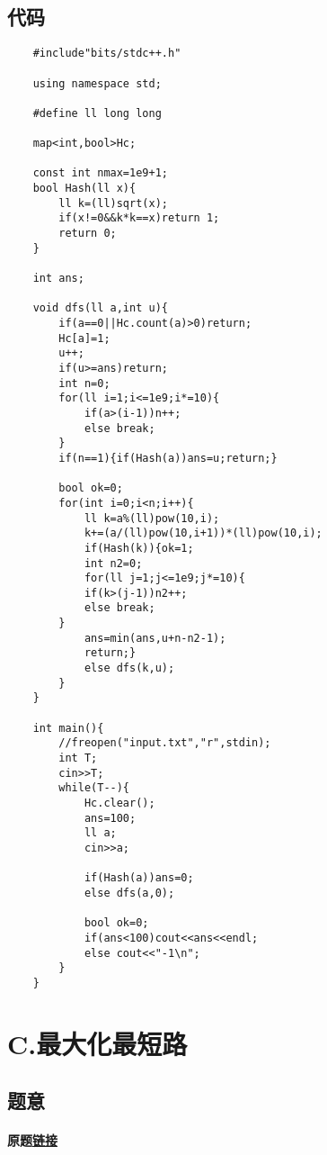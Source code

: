 \documentclass[cyan,pad,cn]{elegantnote}
\begin{document}
\subsection{代码}
\begin{lstlisting}
    #include"bits/stdc++.h"

    using namespace std;
    
    #define ll long long
    
    map<int,bool>Hc;
    
    const int nmax=1e9+1;
    bool Hash(ll x){
        ll k=(ll)sqrt(x);
        if(x!=0&&k*k==x)return 1;
        return 0;
    }
    
    int ans;
    
    void dfs(ll a,int u){
        if(a==0||Hc.count(a)>0)return;
        Hc[a]=1;
        u++;
        if(u>=ans)return;
        int n=0;
        for(ll i=1;i<=1e9;i*=10){
            if(a>(i-1))n++;
            else break;
        }
        if(n==1){if(Hash(a))ans=u;return;}
        
        bool ok=0;
        for(int i=0;i<n;i++){
            ll k=a%(ll)pow(10,i);
            k+=(a/(ll)pow(10,i+1))*(ll)pow(10,i);
            if(Hash(k)){ok=1;
            int n2=0;
            for(ll j=1;j<=1e9;j*=10){
            if(k>(j-1))n2++;
            else break;
        }
            ans=min(ans,u+n-n2-1);
            return;}
            else dfs(k,u);
        }
    }
    
    int main(){
        //freopen("input.txt","r",stdin);
        int T;
        cin>>T;
        while(T--){
            Hc.clear();
            ans=100;
            ll a;
            cin>>a;
            
            if(Hash(a))ans=0;
            else dfs(a,0);
    
            bool ok=0;
            if(ans<100)cout<<ans<<endl;
            else cout<<"-1\n";
        }
    }
\end{lstlisting}

\section{
    C.最大化最短路
}

\subsection{题意}
\paragraph{原题\href{https://www.acwing.com/problem/content/3800/}{链接}}
\end{document}
